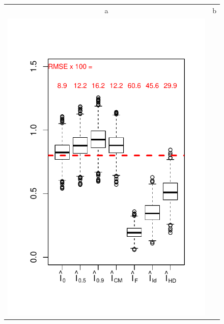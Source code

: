 \begin{figure}
\centering
\begin{tabular}{cc}
a & b\\
\includegraphics[scale = 0.5]{../../info_theory_sims/fig1_with_Id.pdf} &

\end{tabular}
\end{figure}
